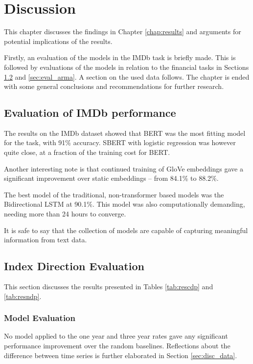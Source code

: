 \chapter{Discussion}

This chapter discusses the findings in Chapter \ref{chap:results} and arguments for potential implications of the results. 

Firstly, an evaluation of the models in the IMDb task is briefly made. This is followed by evaluations of the models in relation to the financial tasks in Sections \ref{sec:eval_index} and \ref{sec:eval_arma}. A section on the used data follows. The chapter is ended with some general conclusions and recommendations for further research.

\section{Evaluation of IMDb performance}

The results on the IMDb dataset showed that BERT was the most fitting model for the task, with 91\% accuracy. SBERT with logistic regression was however quite close, at a fraction of the training cost for BERT.

Another interesting note is that continued training of GloVe embeddings gave a significant improvement over static embeddings -- from 84.1\% to 88.2\%. 

The best model of the traditional, non-transformer based models was the Bidirectional LSTM at 90.1\%. This model was also computationally demanding, needing more than 24 hours to converge. 

It is safe to say that the collection of models are capable of capturing meaningful information from text data.

\section{Index Direction Evaluation}\label{sec:eval_index}

This section discusses the results presented in Tables \ref{tab:rescdp} and \ref{tab:resndp}.

\subsection{Model Evaluation}

No model applied to the one year and three year rates gave any significant performance improvement over the random baselines. Reflections about the difference between time series is further elaborated in Section \ref{sec:disc_data}. 

